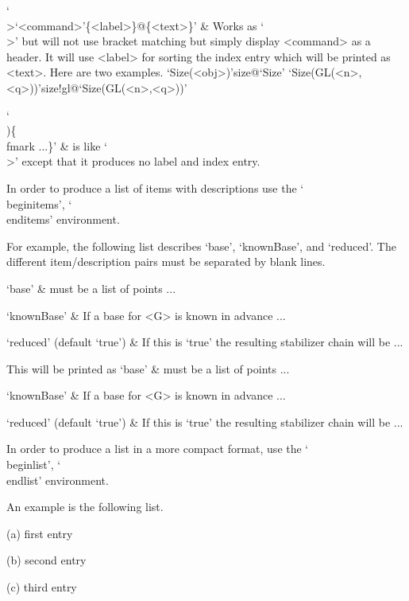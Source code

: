 `\\>{`<command>'}\{<label>\}@\{<text>\}' &
    Works as `\\>' but will not use bracket matching but simply display
    <command> as a header.
    It will use <label> for sorting the index entry which will be printed
    as <text>.
    Here are two examples.
\begintt
\>`Size(<obj>)'{size}@{`Size'}
\>`Size(GL(<n>,<q>))'{size!gl}@{`Size(GL(<n>,<q>))'}
\endtt

`\\)\{\\fmark ...\}' &
    is like `\\>' except that it produces no label and index entry.
\enditems


In order  to   produce  a  list   of  items with   descriptions  use  the
`\\beginitems', `\\enditems' environment.

For example, the   following  list describes   `base', `knownBase',  and
`reduced'.
The different item/description pairs must be separated by blank lines.

\begintt
\beginitems
`base' &
    must be a  list of points ...

`knownBase' &
    If a base for <G> is known in advance ...

`reduced' (default `true') &
    If this is `true' the resulting stabilizer chain will be ...
\enditems
\endtt

This will be printed as
\beginitems
`base' &
    must be a  list of points ...

`knownBase' &
    If a base for <G> is known in advance ...

`reduced' (default `true') &
    If this is `true' the resulting stabilizer chain will be ...
\enditems


In order to produce a list in a more compact format,
use the `\\beginlist', `\\endlist' environment.

An example is the following list.

\begintt
\beginlist
\item{(a)}
    first entry
\item{(b)}
    second entry
\item{(c)}
    third entry
\endlist
\endtt

